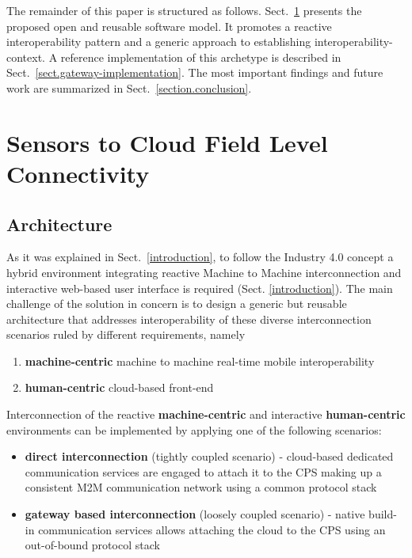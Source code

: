\documentclass{article}
\begin{document}
The remainder of this paper is structured as follows. Sect.~\ref*{cloud-to-sensors-field-level-connectivity} presents the proposed open and reusable software model. It promotes a reactive interoperability pattern and a generic approach to establishing interoperability-context. A reference implementation of this archetype is described in Sect.~\ref*{sect.gateway-implementation}. The most important findings and future work are summarized in Sect.~\ref*{section.conclusion}.

\section{Sensors to Cloud Field Level Connectivity}\label{cloud-to-sensors-field-level-connectivity}

\subsection{Architecture}\label{subs.architecture}

As it was explained in Sect.~\ref*{introduction}, to follow the Industry 4.0 concept a hybrid environment integrating reactive Machine to Machine interconnection and interactive web-based user interface is required (Sect. \ref*{introduction}). The main challenge of the solution in concern is to design a generic but reusable architecture that addresses interoperability of these diverse interconnection scenarios ruled by different requirements, namely

\begin{enumerate}
      \item \textbf{machine-centric} machine to machine real-time mobile interoperability
      \item \textbf{human-centric} cloud-based front-end
\end{enumerate}

Interconnection of the reactive \textbf{machine-centric} and interactive \textbf{human-centric} environments can be implemented by applying one of the following scenarios:

\begin{itemize}
      \item \textbf{direct interconnection} (tightly coupled scenario) - cloud-based dedicated communication services are engaged to attach it to the CPS making up a consistent M2M communication network using a common protocol stack
      \item \textbf{gateway based interconnection} (loosely coupled scenario) - native build-in communication services allows attaching the cloud to the CPS using an out-of-bound protocol stack
\end{itemize}
\end{document}
